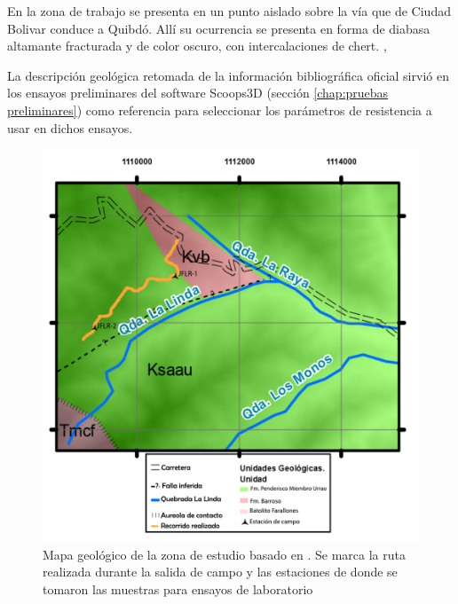 En la zona de trabajo se presenta en un punto aislado sobre la v\'ia que de Ciudad Bolivar conduce a Quibd\'o.
All\'i su ocurrencia se presenta en forma de diabasa altamante fracturada y de color oscuro, con intercalaciones de chert. \cite{barroso}, 




La descripci\'on geol\'ogica retomada de la informaci\'on bibliogr\'afica oficial sirvi\'o en los ensayos preliminares del software Scoops3D (secci\'on \ref{chap:pruebas preliminares}) como referencia para seleccionar los par\'ametros de resistencia a usar en dichos ensayos.

\begin{figure}[H]
\centering
\includegraphics[scale=0.5]{img/geologia.pdf}
\caption{Mapa geol\'ogico de la zona de estudio basado en \cite{geol}. Se marca la ruta realizada durante la salida de campo y las estaciones de donde se tomaron las muestras para ensayos de laboratorio   }
\label{fig:mapageo}
\end{figure}


